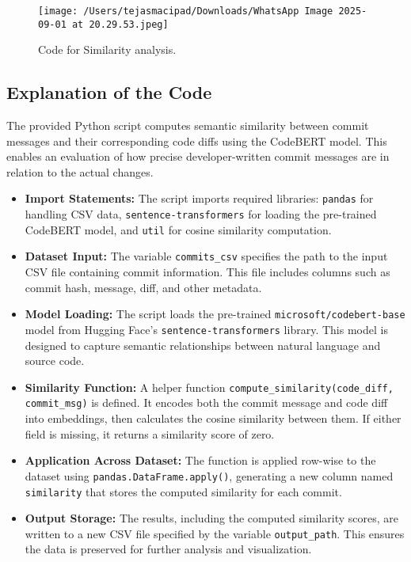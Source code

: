 \documentclass[12pt, a4paper]{report}
\begin{document}
\begin{figure}[h!]
    \centering
    \texttt{[image: /Users/tejasmacipad/Downloads/WhatsApp Image 2025-09-01 at 20.29.53.jpeg]}
    \caption{Code for Similarity analysis.}
\end{figure}

\subsection*{Explanation of the Code}

The provided Python script computes semantic similarity between commit messages and their corresponding code diffs using the CodeBERT model. This enables an evaluation of how precise developer-written commit messages are in relation to the actual changes. 

\begin{itemize}
    \item \textbf{Import Statements:} The script imports required libraries: \texttt{pandas} for handling CSV data, \texttt{sentence-transformers} for loading the pre-trained CodeBERT model, and \texttt{util} for cosine similarity computation.
    
    \item \textbf{Dataset Input:} The variable \texttt{commits\_csv} specifies the path to the input CSV file containing commit information. This file includes columns such as commit hash, message, diff, and other metadata.
    
    \item \textbf{Model Loading:} The script loads the pre-trained \texttt{microsoft/codebert-base} model from Hugging Face’s \texttt{sentence-transformers} library. This model is designed to capture semantic relationships between natural language and source code.
    
    \item \textbf{Similarity Function:} A helper function \texttt{compute\_similarity(code\_diff, commit\_msg)} is defined. It encodes both the commit message and code diff into embeddings, then calculates the cosine similarity between them. If either field is missing, it returns a similarity score of zero.
    
    \item \textbf{Application Across Dataset:} The function is applied row-wise to the dataset using \texttt{pandas.DataFrame.apply()}, generating a new column named \texttt{similarity} that stores the computed similarity for each commit.
    
    \item \textbf{Output Storage:} The results, including the computed similarity scores, are written to a new CSV file specified by the variable \texttt{output\_path}. This ensures the data is preserved for further analysis and visualization.
\end{itemize}
\end{document}
